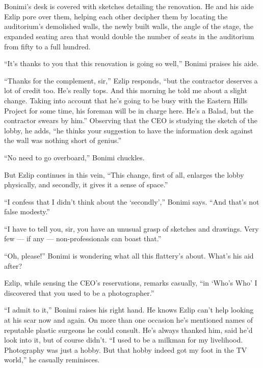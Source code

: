 \documentclass[twoside,11pt,openany]{book}
\begin{document}
\chapter{}

Bonimi's desk is covered with sketches detailing the renovation. He and his aide Ezlip pore over them,
helping each other decipher them by locating the auditorium's demolished walls, the newly built walls, the angle of the
stage, the expanded seating area that would double the number of seats in the auditorium from fifty to a
full hundred.

``It's thanks to you that this renovation is going so well,'' Bonimi{ }praises his aide.

``Thanks for the complement, sir,'' Ezlip responds, ``but the contractor deserves
a lot of credit too. He's really tops. And this morning he told me about a slight change. Taking into account that he's
going to be busy with the Eastern Hills Project for some time, his foreman will be in charge here.  He's a Balad, but
the contractor swears{ }by him.'' Observing that the CEO is studying the sketch of the
lobby, he adds, ``he thinks your suggestion to{ }have the information desk against the
wall was nothing short of genius.''

``No need to go overboard,'' Bonimi chuckles.

But Ezlip continues in this vein, ``This change, first of all, enlarges the lobby physically, and secondly,
it gives it a sense of space.''

``I confess that I didn't think about the `secondly','' Bonimi says. ``And that's
not false modesty.''

``I have to tell you, sir, you have an unusual grasp of sketches and drawings. Very few --- if any ---
non-professionals can boast that.''

``Oh, please!'' Bonimi is wondering what all this flattery's about. What's his aid after?

Ezlip, while sensing the CEO's reservations, remarks casually, ``in `Who's Who' I discovered that you used
to be a photographer.''

``I admit to it,'' Bonimi raises his right hand. He knows Ezlip can't help looking at his scar
now and again. On more than one occasion he's mentioned names of reputable{ }plastic surgeons he could
consult. He's always thanked him, said he'd look into it, but of course didn't. ``I used to be a milkman
for my livelihood. Photography was just a hobby. But that hobby indeed got my foot in the TV world,'' he
casually reminisces.
\end{document}

